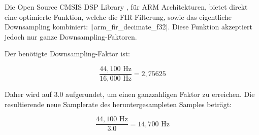 Die Open Source CMSIS DSP Library \cite{cmsis-dsp}, für ARM Architekturen, bietet direkt eine optimierte Funktion, welche die FIR-Filterung, sowie das eigentliche Downsampling kombiniert: \texttt|arm_fir_decimate_f32|.
Diese Funktion akzeptiert jedoch nur ganze Downsampling-Faktoren.

Der benötigte Downsampling-Faktor ist:

\[
\frac{44{,}100 \text{ Hz}}{16{,}000 \text{ Hz}} = 2{,}75625
\]

Daher wird auf \(3.0\) aufgerundet, um einen ganzzahligen Faktor zu erreichen. 
Die resultierende neue Samplerate des heruntergesampleten Samples beträgt:

\[
\frac{44{,}100 \text{ Hz}}{3.0} = 14{,}700 \text{ Hz}
\]


